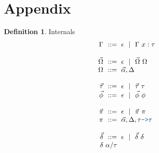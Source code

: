 \documentclass[acmsmall]{acmart}
\theoremstyle{definition}
\newtheorem{definition}{Definition}[section]
\begin{document}








\section{Appendix}
\label{sect:appendix}
\begin{definition} Internals 
  \label{def:internals}
  \[\begin{array}[t]{r@{}l}
    \nonterm{\Gamma} & \is \epsilon \sep \Gamma\ x : \tau
    \\
    \\
    \nonterm{\vec{\Omega}} & \is \epsilon \sep \vec{\Omega}\ \Omega
    \\
    \nonterm{\Omega} & \is \vec{\alpha}, \Delta
    \\
    \\
    \nonterm{\vec{\tau}} & \is \epsilon \sep \vec{\tau}\ \tau
    \\
    \nonterm{\vec{\phi}} & \is \epsilon \sep \vec{\phi}\ \phi
    \\
    \\
    \nonterm{\vec{\pi}} & \is \epsilon \sep \vec{\pi}\ \pi
    \\
    \nonterm{\pi} & \is \vec{\alpha}, \Delta, \tau \obj{->} \tau
    \\
    \\
    \nonterm{\vec{\delta}} & \is \epsilon \sep \vec{\delta}\ \delta
    \\
    \nonterm{\delta} & \alpha \slash \tau
  \end{array}\]
\end{definition}
\end{document}
